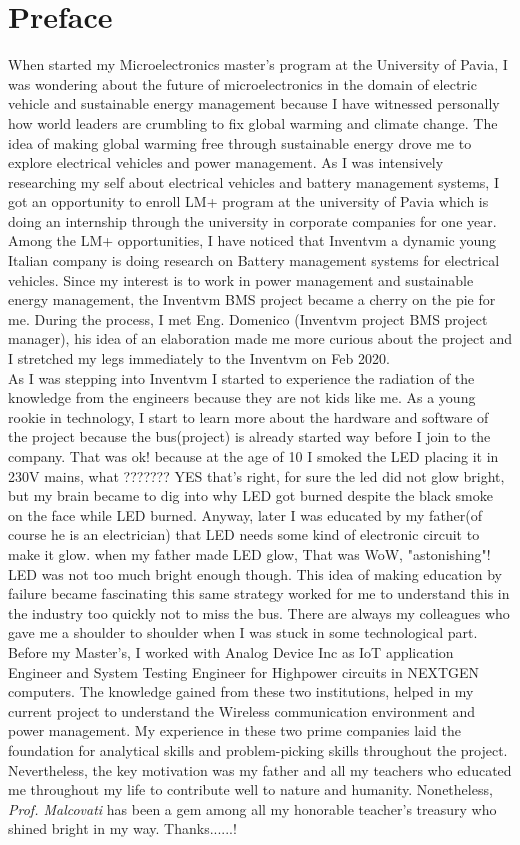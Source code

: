 \chapter*{Preface}
When started my Microelectronics master's program at the University of Pavia, I was wondering about the future of microelectronics in the domain of electric vehicle and sustainable energy management because I have witnessed personally how world leaders are crumbling to fix global warming and climate change. The idea of making global warming free through sustainable energy drove me to explore electrical vehicles and power management. As I was intensively researching my self about electrical vehicles and battery management systems, I got an opportunity to enroll LM+ program at the university of Pavia which is doing an internship through the university in corporate companies for one year.\\
\indent Among the LM+ opportunities, I have noticed that Inventvm a dynamic young Italian company is doing research on Battery management systems for electrical vehicles. Since my interest is to work in power management and sustainable energy management, the Inventvm BMS project became a cherry on the pie for me. During the process, I met Eng. Domenico (Inventvm project BMS project manager), his idea of an elaboration made me more curious about the project and I stretched my legs immediately to the Inventvm on Feb 2020.\\
\indent As I was stepping into Inventvm I started to experience the radiation of the knowledge from the engineers because they are not kids like me. As a young rookie in technology, I start to learn more about the hardware and software of the project because the bus(project) is already started way before I join to the company. That was ok! because at the age of 10 I smoked the LED placing it in 230V mains, what ??????? YES that's right, for sure the led did not glow bright, but my brain became to dig into why LED got burned despite the black smoke on the face while LED burned. Anyway, later I was educated by my father(of course he is an electrician) that LED needs some kind of electronic circuit to make it glow. when my father made LED glow, That was WoW, "astonishing"! LED was not too much bright enough though. This idea of making education by failure became fascinating this same strategy worked for me to understand this in the industry too quickly not to miss the bus. There are always my colleagues who gave me a shoulder to shoulder when I was stuck in some technological part.\\
\indent Before my Master's, I worked with Analog Device Inc as IoT application Engineer and System Testing Engineer for Highpower circuits in NEXTGEN computers. The knowledge gained from these two institutions, helped in my current project to understand the Wireless communication environment and power management. My experience in these two prime companies laid the foundation for analytical skills and problem-picking skills throughout the project. Nevertheless, the key motivation was my father and all my teachers who educated me throughout my life to contribute well to nature and humanity. Nonetheless, \textit{Prof. Malcovati} has been a gem among all my honorable teacher's treasury who shined bright in my way. Thanks......!